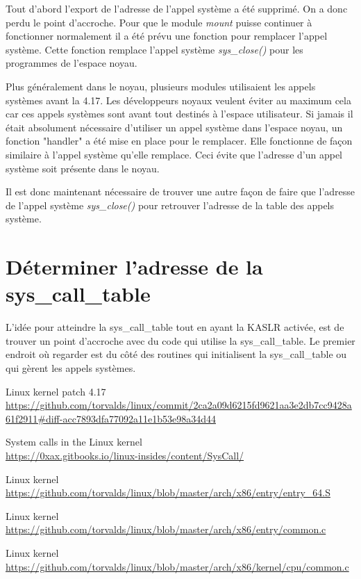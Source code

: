 \documentclass[journal, a4paper]{IEEEtran}
\begin{document}
Tout d'abord l'export de l'adresse de l'appel système a été supprimé. On a donc perdu le point d'accroche. Pour que le module \textit{mount} puisse continuer à fonctionner normalement il a été prévu une fonction pour remplacer l'appel système. Cette fonction remplace l'appel système \textit{sys\_close()} pour les programmes de l'espace noyau.

 Plus généralement dans le noyau, plusieurs modules utilisaient les appels systèmes avant la 4.17. Les développeurs noyaux veulent éviter au maximum cela car ces appels systèmes sont avant tout destinés à l'espace utilisateur. Si jamais il était absolument nécessaire d'utiliser un appel système dans l'espace noyau, un fonction "handler" a été mise en place pour le remplacer. Elle fonctionne de façon similaire à l'appel système qu'elle remplace. Ceci évite que l'adresse d'un appel système soit présente dans le noyau.

Il est donc maintenant nécessaire de trouver une autre façon de faire que l'adresse de l'appel système \textit{sys\_close()} pour retrouver l'adresse de la table des appels système.

\section{Déterminer l'adresse de la sys\_call\_table}

L'idée pour atteindre la sys\_call\_table tout en ayant la KASLR activée, est de trouver un point d'accroche avec du code qui utilise la sys\_call\_table. Le premier endroit où regarder est du côté des routines qui initialisent la sys\_call\_table ou qui gèrent les appels systèmes.


\begin{thebibliography}{}
	Linux kernel patch 4.17\\
	\url{https://github.com/torvalds/linux/commit/2ca2a09d6215fd9621aa3e2db7cc9428a61f2911#diff-acc7893dfa77092a11e1b53e98a34d44}

	System calls in the Linux kernel\\
	\url{https://0xax.gitbooks.io/linux-insides/content/SysCall/}

	Linux kernel\\
	\url{https://github.com/torvalds/linux/blob/master/arch/x86/entry/entry_64.S}

	Linux kernel\\
	\url{https://github.com/torvalds/linux/blob/master/arch/x86/entry/common.c}

	Linux kernel\\
	\url{https://github.com/torvalds/linux/blob/master/arch/x86/kernel/cpu/common.c}
\end{thebibliography}
\end{document}
